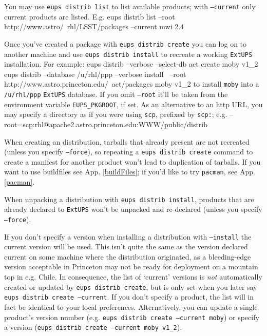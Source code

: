 \documentclass{article}
\newcommand{\code}[1]{\texttt{#1}}
\newcommand{\file}[1]{\texttt{#1}}
\newcommand{\eups}{\code{ExtUPS}}
\newcommand{\pacman}{\code{pacman}}
\let\overbatim=\verbatim
\let\oendverbatim=\endverbatim
\renewenvironment{verbatim}
{\center\minipage{16cm}\overbatim}
{\oendverbatim\endminipage\endcenter}
\begin{document}
You may use \code{eups distrib list} to list available products; with \code{--current}
only current products are listed.  E.g.
\begin{verbatim}
eups distrib list --root http://www.astro/~rhl/LSST/packages --current mwi 2.4
\end{verbatim}

Once you've created a package with \code{eups distrib create} you can log on to
another machine and use \code{eups distrib install} to
recreate a working \eups{} installation.  For example:
\begin{verbatim}
eups distrib --verbose --select-db act create moby v1_2
eups distrib --database /u/rhl/ppp --verbose install \
             --root http://www.astro.princeton.edu/~act/packages moby v1_2
\end{verbatim}
to install \code{moby} into a \file{/u/rhl/ppp} \eups{} database. If you omit
\code{--root} it'll be taken from the environment variable \code{EUPS\_PKGROOT},
if set.  As an alternative to an http URL, you may specify a directory as
if you were using \code{scp}, prefixed by \code{scp:}; e.g.
\begin{verbatim}
    --root=scp:rhl@apache2.astro.princeton.edu:WWW/public/distrib
\end{verbatim}

When creating an distribution, tarballs that already present are not recreated
(unless you specify \code{--force}),
so repeating a \code{eups distrib create} command to create a manifest for another
product won't lead to duplication of tarballs.  If you want to use buildfiles
see App. \ref{buildFiles}; if you'd like to try \pacman{}, see App. \ref{pacman}.

When unpacking a distribution with \code{eups distrib install}, products that are
already declared to \eups{} won't be unpacked and re-declared (unless you specify \code{--force}).

If you don't specify a version when installing a distribution with
\code{--install} the current version will be used.  This isn't quite the same
as the version declared current on some machine where the distribution
originated, as a bleeding-edge version acceptable in Princeton may not
be ready for deployment on a mountain top in e.g. Chile. In
consequence, the list of `current' versions is \textit{not}
automatically created or updated by \code{eups distrib create}, but is
only set when you later say \code{eups distrib create --current}.  If you don't specify
a product, the list will in fact be identical to your local preferences.
Alternatively, you can update a single product's version number (e.g.
\code{eups distrib create --current moby}) or specify a version (\code{eups distrib create --current moby v1\_2}).
\end{document}
